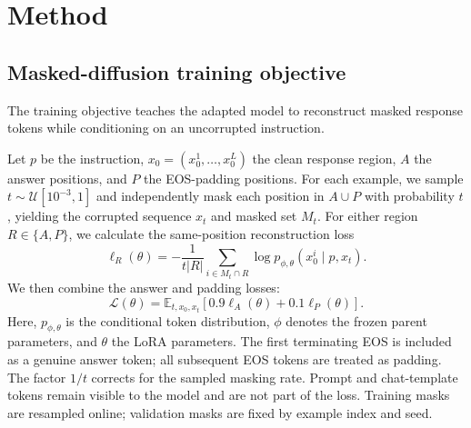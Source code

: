 \documentclass{article}
\begin{document}
\section{Method}

\subsection{Masked-diffusion training objective}

The training objective teaches the adapted model to reconstruct masked response tokens while conditioning on an uncorrupted instruction.

Let $p$ be the instruction, $x_0=(x_0^1,\ldots,x_0^L)$ the clean response region, $A$ the answer positions, and $P$ the EOS-padding positions. For each example, we sample $t\sim\mathcal{U}[10^{-3},1]$ and independently mask each position in $A\cup P$ with probability $t$, yielding the corrupted sequence $x_t$ and masked set $M_t$. For either region $R\in\{A,P\}$, we calculate the same-position reconstruction loss
\begin{equation}
\ell_R(\theta)=-\frac{1}{t|R|}
\sum_{i\in M_t\cap R}
\log p_{\phi,\theta}(x_0^i\mid p,x_t).
\label{eq:region-loss}
\end{equation}
We then combine the answer and padding losses:
\begin{equation}
\mathcal{L}(\theta)=\mathbb{E}_{t,x_0,x_t}
\left[0.9\ell_A(\theta)+0.1\ell_P(\theta)\right].
    \label{eq:objective}
\end{equation}
Here, $p_{\phi,\theta}$ is the conditional token distribution, $\phi$ denotes the frozen parent parameters, and $\theta$ the LoRA parameters. The first terminating EOS is included as a genuine answer token; all subsequent EOS tokens are treated as padding. The factor $1/t$ corrects for the sampled masking rate. Prompt and chat-template tokens remain visible to the model and are not part of the loss. Training masks are resampled online; validation masks are fixed by example index and seed.
\end{document}
